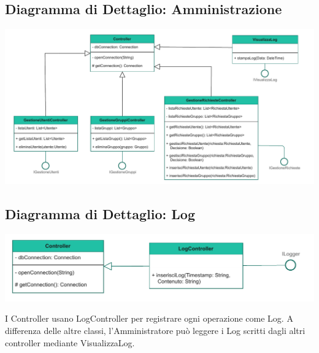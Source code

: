 \subsection*{Diagramma di Dettaglio: Amministrazione}
{}
\begin{adjustwidth}{-3cm}{0cm}
\includegraphics[scale=0.8]{progettazione/Progettazione-Dettaglio Amministratore.drawio.pdf}
\end{adjustwidth}
\vspace{0.5cm}


\subsection*{Diagramma di Dettaglio: Log}
{}
\begin{adjustwidth}{-2cm}{0cm}
\includegraphics[scale=1]{progettazione/Progettazione-DettagliLog.drawio.pdf}
\end{adjustwidth}
\vspace{0.5cm}

I Controller usano LogController per registrare ogni operazione come Log. A differenza delle altre classi, l'Amministratore può leggere i Log scritti dagli altri controller mediante VisualizzaLog.\\
\vspace{2cm}


